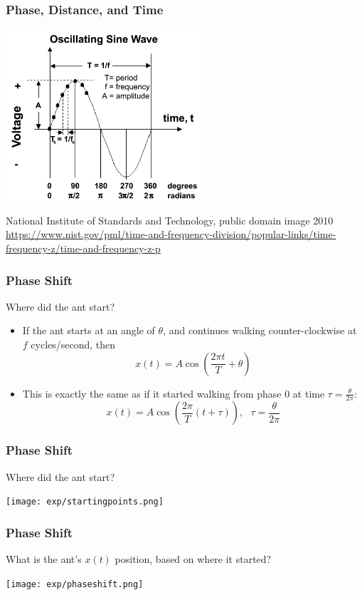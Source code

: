 \documentclass{beamer}
\begin{document}
\begin{frame}
  \frametitle{Phase, Distance, and Time}
  \centerline{\includegraphics[height=2.5in]{Oscillating_sine_wave.png}}
  \begin{tiny}
    National Institute of Standards and Technology, public domain image 2010
    \url{https://www.nist.gov/pml/time-and-frequency-division/popular-links/time-frequency-z/time-and-frequency-z-p}
  \end{tiny}
\end{frame}

\begin{frame}
  \frametitle{Phase Shift}

  Where did the ant start?
  \begin{itemize}
  \item If the ant starts at an angle of $\theta$, and continues walking counter-clockwise
    at $f$ cycles/second, then
    \[
    x(t) = A\cos\left(\frac{2\pi t}{T}+\theta\right)
    \]
  \item This is exactly the same as if it started walking from phase 0 at time
    $\tau=\frac{\theta}{2\pi}$:
    \[
    x(t) = A\cos\left(\frac{2\pi}{T}\left(t+\tau\right)\right),~~~\tau=\frac{\theta}{2\pi}
    \]
  \end{itemize}
\end{frame}

\begin{frame}
  \frametitle{Phase Shift}

  Where did the ant start?
  
  \centerline{\texttt{[image: exp/startingpoints.png]}}
\end{frame}

\begin{frame}
  \frametitle{Phase Shift}
  
  What is the ant's $x(t)$ position, based on where it started?
  
  \centerline{\texttt{[image: exp/phaseshift.png]}}
\end{frame}
\end{document}
